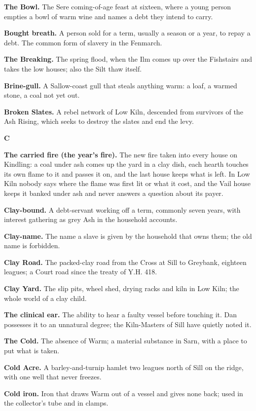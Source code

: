 \documentclass{design/chronicle}
\begin{document}
\textbf{The Bowl.} The Sere coming-of-age feast at sixteen, where a young person empties a bowl of warm wine and names a debt they intend to carry.

\textbf{Bought breath.} A person sold for a term, usually a season or a year, to repay a debt. The common form of slavery in the Fenmarch.

\textbf{The Breaking.} The spring flood, when the Ilm comes up over the Fishstairs and takes the low houses; also the Silt thaw itself.

\textbf{Brine-gull.} A Sallow-coast gull that steals anything warm: a loaf, a warmed stone, a coal not yet out.

\textbf{Broken Slates.} A rebel network of Low Kiln, descended from survivors of the Ash Rising, which seeks to destroy the slates and end the levy.

\textbf{C}

\textbf{The carried fire (the year’s fire).} The new fire taken into every house on Kindling: a coal under ash comes up the yard in a clay dish, each hearth touches its own flame to it and passes it on, and the last house keeps what is left. In Low Kiln nobody says where the flame was first lit or what it cost, and the Vail house keeps it banked under ash and never answers a question about its payer.

\textbf{Clay-bound.} A debt-servant working off a term, commonly seven years, with interest gathering as grey Ash in the household accounts.

\textbf{Clay-name.} The name a slave is given by the household that owns them; the old name is forbidden.

\textbf{Clay Road.} The packed-clay road from the Cross at Sill to Greybank, eighteen leagues; a Court road since the treaty of Y.H. 418.

\textbf{Clay Yard.} The slip pits, wheel shed, drying racks and kiln in Low Kiln; the whole world of a clay child.

\textbf{The clinical ear.} The ability to hear a faulty vessel before touching it. Dan possesses it to an unnatural degree; the Kiln-Masters of Sill have quietly noted it.

\textbf{The Cold.} The absence of Warm; a material substance in Sarn, with a place to put what is taken.

\textbf{Cold Acre.} A barley-and-turnip hamlet two leagues north of Sill on the ridge, with one well that never freezes.

\textbf{Cold iron.} Iron that draws Warm out of a vessel and gives none back; used in the collector’s tube and in clamps.
\end{document}
